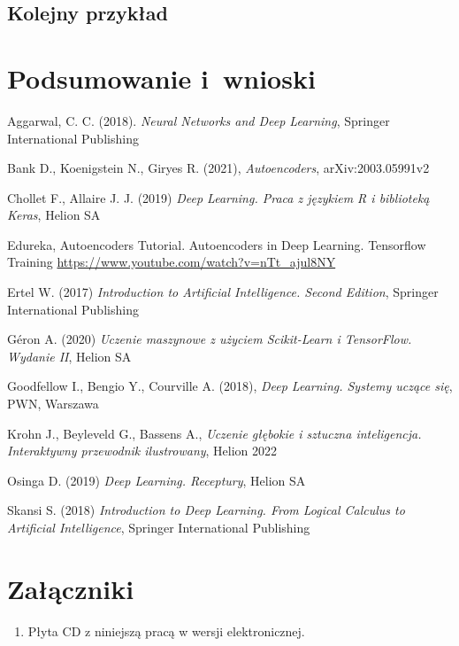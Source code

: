 \documentclass[12pt]{mwbk}
\theoremstyle{plain}
\theoremstyle{definition}
\theoremstyle{remark}
\begin{document}
\section{Kolejny przykład}


\chapter*{Podsumowanie i~wnioski}


\begin{thebibliography}{99}

 Aggarwal, C. C. (2018).\emph{ Neural Networks and Deep Learning}, Springer International Publishing

 Bank D., Koenigstein N., Giryes R. (2021), \emph{Autoencoders}, arXiv:2003.05991v2

 Chollet F., Allaire J. J. (2019) \emph{Deep Learning. Praca z językiem R i biblioteką Keras}, Helion SA

 Edureka, Autoencoders Tutorial. Autoencoders in Deep Learning. Tensorflow Training \url{https://www.youtube.com/watch?v=nTt_ajul8NY} 

 Ertel W. (2017) \emph{Introduction to Artificial Intelligence. Second Edition}, Springer International Publishing

 G\'eron A. (2020) \emph{Uczenie maszynowe z użyciem Scikit-Learn i TensorFlow. Wydanie II}, Helion SA

 Goodfellow I., Bengio Y., Courville A. (2018), \emph{Deep Learning. Systemy uczące się}, PWN, Warszawa 

 Krohn J., Beyleveld G., Bassens A., \emph{Uczenie głębokie i sztuczna inteligencja. Interaktywny przewodnik ilustrowany}, Helion 2022

 Osinga D. (2019) \emph{Deep Learning. Receptury}, Helion SA

 Skansi S. (2018) \emph{Introduction to Deep Learning. From Logical Calculus to Artificial Intelligence}, Springer International Publishing


\end{thebibliography}



\listoffigures

\listoftables


\chapter*{Załączniki}
\begin{enumerate}
\item Płyta CD z niniejszą pracą w wersji elektronicznej.
\end{enumerate}
\end{document}
